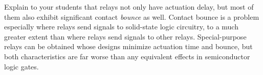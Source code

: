 Explain to your students that relays not only have actuation delay, but most of them also exhibit significant contact {\it bounce} as well.  Contact bounce is a problem especially where relays send signals to solid-state logic circuitry, to a much greater extent than where relays send signals to other relays.  Special-purpose relays can be obtained whose designs minimize actuation time and bounce, but both characteristics are far worse than any equivalent effects in semiconductor logic gates.




